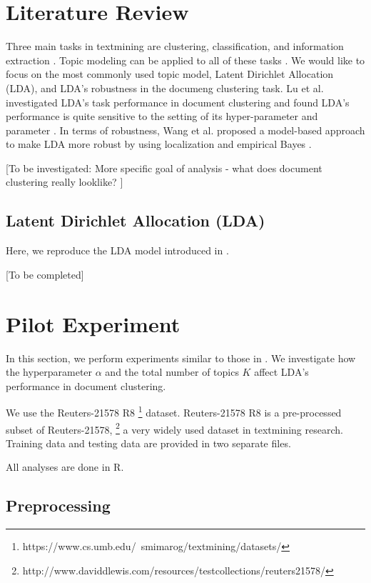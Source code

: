 \documentclass{article}
\begin{document}
\section{Literature Review}

Three main tasks in textmining are clustering, classification, and information extraction \cite{allahyari2017brief}. Topic modeling can be applied to all of these tasks \cite{lu2011investigating}. We would like to focus on the most commonly used topic model, Latent Dirichlet Allocation (LDA), and LDA's robustness in the documeng clustering task. Lu et al. investigated LDA's task performance in document clustering and found LDA's performance is quite sensitive to the setting of its hyper-parameter and parameter \cite{lu2011investigating}. In terms of robustness, Wang et al. proposed a model-based approach to make LDA more robust by using localization and empirical Bayes \cite{wang2018general}.

[To be investigated: More specific goal of analysis - what does document clustering really looklike? ]


\subsection{Latent Dirichlet Allocation (LDA)}

Here, we reproduce the LDA model introduced in \cite{wang2018general}.

[To be completed]




\section{Pilot Experiment}

In this section, we perform experiments similar to those in \cite{lu2011investigating}. We investigate how the hyperparameter $\alpha$ and the total number of topics $K$ affect LDA's performance in document clustering.

We use the Reuters-21578 R8 \footnote{https://www.cs.umb.edu/~smimarog/textmining/datasets/} dataset. Reuters-21578 R8 is a pre-processed subset of Reuters-21578, \footnote{http://www.daviddlewis.com/resources/testcollections/reuters21578/} a very widely used dataset in textmining research. Training data and testing data are provided in two separate files.

All analyses are done in R.

\subsection{Preprocessing}
\end{document}
